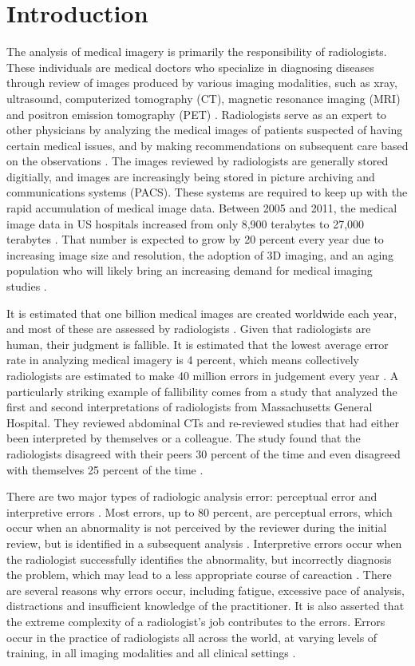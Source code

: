 \documentclass[sigconf]{acmart}
\begin{document}
\section{Introduction}
The analysis of medical imagery is primarily the responsibility of radiologists. These individuals are medical doctors who specialize in diagnosing diseases through review of images produced by various imaging modalities, such as xray, ultrasound, computerized tomography (CT), magnetic resonance imaging (MRI) and positron emission tomography (PET) \cite{cite00}. Radiologists serve as an expert to other physicians by analyzing the medical images of patients suspected of having certain medical issues, and by making recommendations on subsequent care based on the observations \cite{cite00}. The images reviewed by radiologists are generally stored digitially, and images are increasingly being stored in picture archiving and communications systems (PACS). These systems are required to keep up with the rapid accumulation of medical image data. Between 2005 and 2011, the medical image data in US hospitals increased from only 8,900 terabytes to 27,000 terabytes \cite{cite04}. That number is expected to grow by 20 percent every year due to increasing image size and resolution, the adoption of 3D imaging, and an aging population who will likely bring an increasing demand for medical imaging studies \cite{cite04}.

It is estimated that one billion medical images are created worldwide each year, and most of these are assessed by radiologists \cite{cite01}. Given that radiologists are human, their judgment is fallible. It is estimated that the lowest average error rate in analyzing medical imagery is 4 percent, which means collectively radiologists are estimated to make 40 million errors in judgement every year \cite{cite01}. A particularly striking example of fallibility comes from a study that analyzed the first and second interpretations of radiologists from Massachusetts General Hospital. They reviewed abdominal CTs and re-reviewed studies that had either been interpreted by themselves or a colleague. The study found that the radiologists disagreed with their peers 30 percent of the time and even disagreed with themselves 25 percent of the time \cite{cite01}.

There are two major types of radiologic analysis error: perceptual error and interpretive errors \cite{cite01}. Most errors, up to 80 percent, are perceptual errors, which occur when an abnormality is not perceived by the reviewer during the initial review, but is identified in a subsequent analysis \cite{cite01}. Interpretive errors occur when the radiologist successfully identifies the abnormality, but incorrectly diagnosis the problem, which may lead to a less appropriate course of careaction \cite{cite01}. There are several reasons why errors occur, including fatigue, excessive pace of analysis, distractions and insufficient knowledge of the practitioner. It is also asserted that the extreme complexity of a radiologist's job contributes to the errors. Errors occur in the practice of radiologists all across the world, at varying levels of training, in all imaging modalities and all clinical settings \cite{cite01}.
\end{document}
